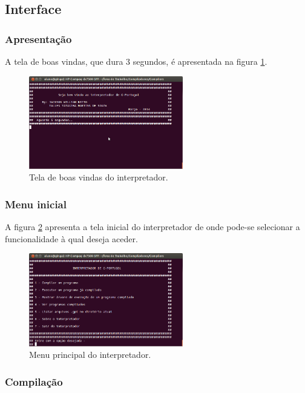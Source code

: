 \documentclass[a4paper,12pt]{report}
\begin{document}
\subsection{Interface}

\subsubsection{Apresenta\c{c}\~ao}

A tela de boas vindas, que dura 3 segundos, \'e apresentada na figura \ref{fig:apres}.

\begin{figure}
\centering
\includegraphics[width=0.6\textwidth]{imgs/Apresentacao.png}
\caption{\label{fig:apres}Tela de boas vindas do interpretador.}
\end{figure}

\subsubsection{Menu inicial}

A figura \ref{fig:menuinicial} apresenta a tela inicial do interpretador de onde pode-se selecionar a funcionalidade \`a qual deseja aceder.

\begin{figure}
\centering
\includegraphics[width=0.6\textwidth]{imgs/menu_inicial.png}
\caption{\label{fig:menuinicial}Menu principal do interpretador.}
\end{figure}

\subsubsection{Compila\c{c}\~ao}
\end{document}
